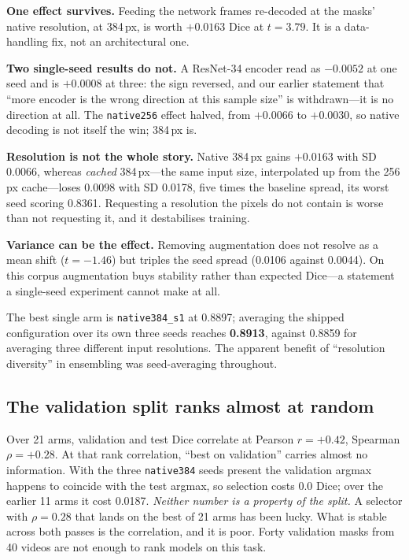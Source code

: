 \documentclass[conference]{IEEEtran}
\begin{document}
\textbf{One effect survives.} Feeding the network frames re-decoded at the
masks' native resolution, at 384\,px, is worth $+0.0163$ Dice at $t=3.79$. It
is a data-handling fix, not an architectural one.

\textbf{Two single-seed results do not.} A ResNet-34 encoder read as $-0.0052$
at one seed and is $+0.0008$ at three: the sign reversed, and our earlier
statement that ``more encoder is the wrong direction at this sample size'' is
withdrawn---it is no direction at all. The \texttt{native256} effect halved,
from $+0.0066$ to $+0.0030$, so native decoding is not itself the win; 384\,px
is.

\textbf{Resolution is not the whole story.} Native 384\,px gains $+0.0163$ with
SD 0.0066, whereas \emph{cached} 384\,px---the same input size, interpolated up
from the 256\,px cache---loses 0.0098 with SD 0.0178, five times the baseline
spread, its worst seed scoring 0.8361. Requesting a resolution the pixels do
not contain is worse than not requesting it, and it destabilises training.

\textbf{Variance can be the effect.} Removing augmentation does not resolve as
a mean shift ($t=-1.46$) but triples the seed spread (0.0106 against 0.0044).
On this corpus augmentation buys stability rather than expected Dice---a
statement a single-seed experiment cannot make at all.

The best single arm is \texttt{native384\_s1} at 0.8897; averaging the shipped
configuration over its own three seeds reaches \textbf{0.8913}, against 0.8859
for averaging three different input resolutions. The apparent benefit of
``resolution diversity'' in ensembling was seed-averaging throughout.

\subsection{The validation split ranks almost at random}

Over 21 arms, validation and test Dice correlate at Pearson $r=+0.42$,
Spearman $\rho=+0.28$. At that rank correlation, ``best on validation'' carries
almost no information. With the three \texttt{native384} seeds present the
validation argmax happens to coincide with the test argmax, so selection costs
0.0 Dice; over the earlier 11 arms it cost 0.0187. \emph{Neither number is a
property of the split.} A selector with $\rho=0.28$ that lands on the best of
21 arms has been lucky. What is stable across both passes is the correlation,
and it is poor. Forty validation masks from 40 videos are not enough to rank
models on this task.
\end{document}
